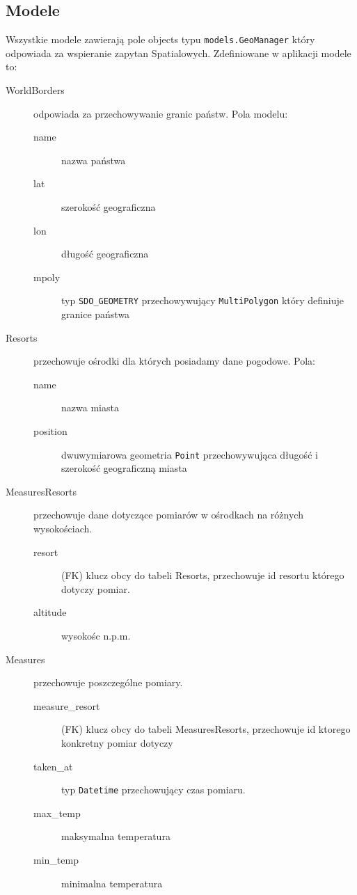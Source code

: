 \documentclass[12pt]{article}
\begin{document}
\subsection{Modele}
Wszystkie modele zawierają pole objects typu \texttt{models.GeoManager} który odpowiada za wspieranie zapytan Spatialowych.
Zdefiniowane w aplikacji modele to:
\begin{description}
\item[WorldBorders] odpowiada za przechowywanie granic państw. Pola modelu:
  \begin{description}
  \item[name] nazwa państwa
  \item[lat] szerokość geograficzna
  \item[lon] długość geograficzna
  \item[mpoly] typ \texttt{SDO\_GEOMETRY} przechowywujący \texttt{MultiPolygon} który
    definiuje granice państwa
  \end{description}
\item[Resorts] przechowuje ośrodki dla których posiadamy dane pogodowe. Pola:
  \begin{description}
    \item[name] nazwa miasta
    \item[position] dwuwymiarowa geometria \texttt{Point} przechowywująca długość i
      szerokość geograficzną miasta
  \end{description}
\item[MeasuresResorts] przechowuje dane dotyczące pomiarów w ośrodkach na różnych wysokościach.
  \begin{description}
    \item[resort] (FK) klucz obcy do tabeli Resorts, przechowuje id resortu którego dotyczy pomiar.
    \item[altitude] wysokośc n.p.m.
  \end{description}
\item[Measures] przechowuje poszczególne pomiary.
  \begin{description}
    \item[measure\_resort] (FK) klucz obcy do tabeli MeasuresResorts, przechowuje id ktorego konkretny pomiar dotyczy
    \item[taken\_at] typ \texttt{Datetime} przechowujący czas pomiaru.
    \item[max\_temp] maksymalna temperatura
    \item[min\_temp] minimalna temperatura
  \end{description}
\end{description}
\end{document}
